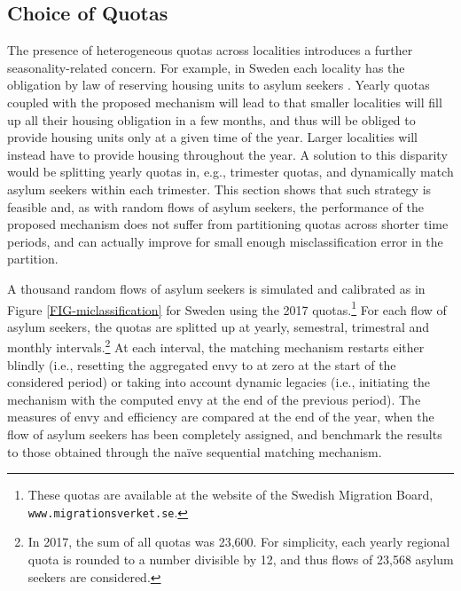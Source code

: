 \documentclass[12pt,fleqn]{article}
\begin{document}
\subsection{Choice of Quotas}\label{SEC:quotas}
The presence of heterogeneous quotas across localities introduces a further seasonality-related concern. For example, in Sweden each locality has the obligation by law of reserving housing units to asylum seekers \citep[Swedish Law,][]{SFS2016}. Yearly quotas coupled with the proposed mechanism will lead to that smaller localities will fill up all their housing obligation in a few months, and thus will be obliged to provide housing units only at a given time of the year. Larger localities will instead have to provide housing throughout the year. A solution to this disparity would be splitting yearly quotas in, e.g., trimester quotas, and dynamically match asylum seekers within each trimester. This section shows that such strategy is feasible and, as with random flows of asylum seekers, the performance of the proposed mechanism does not suffer from partitioning quotas across shorter time periods, and can actually improve for small enough misclassification error in the partition.

A thousand random flows of asylum seekers is simulated and calibrated as in Figure \ref{FIG-miclassification} for Sweden using the 2017 quotas.\footnote{These quotas are available at the website of the Swedish Migration Board, \texttt{www.migrationsverket.se}.} For each flow of asylum seekers, the quotas are splitted up at yearly, semestral, trimestral and monthly intervals.\footnote{In 2017, the sum of all quotas was 23,600. For simplicity, each yearly regional quota is rounded to a number divisible by 12, and thus flows of 23,568 asylum seekers are considered.} At each interval, the matching mechanism restarts either blindly (i.e., resetting the aggregated envy to at zero at the start of the considered period) or taking into account dynamic legacies (i.e., initiating the mechanism with the computed envy at the end of the previous period). The measures of envy and efficiency are compared at the end of the year, when the flow of asylum seekers has been completely assigned, and benchmark the results to those obtained through the na\"{i}ve sequential matching mechanism.
\end{document}

